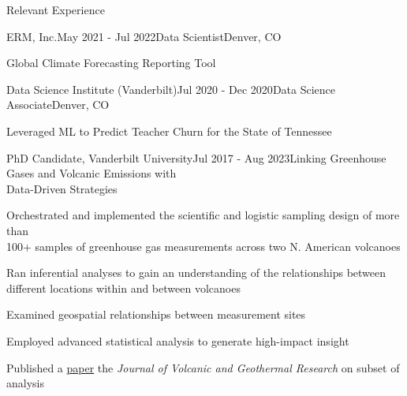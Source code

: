 \documentclass{resume} %
\begin{document}
\begin{rSection}{Relevant Experience}
\begin{rSubsection}{ERM, Inc.}{May 2021 - Jul 2022}{Data Scientist}{Denver, CO}
    \item {Global Climate Forecasting Reporting Tool}
        \vspace{-0.5em}
        \vspace{-0.5em}
        \vspace{0.25em}
    \end{rSubsection} 

    \begin{rSubsection}{Data Science Institute (Vanderbilt)}{Jul 2020 - Dec 2020}{Data Science Associate}{Denver, CO} 
        \item {Leveraged ML to Predict Teacher Churn for the State of Tennessee}
        \vspace{-0.5em}
    \end{rSubsection} 

    
    \begin{rSubsection}{PhD Candidate, Vanderbilt University}{Jul 2017 - Aug 2023}{Linking Greenhouse Gases and Volcanic Emissions with \\ Data-Driven Strategies}{}
        \item {Orchestrated and implemented the scientific and logistic sampling design of more than \\ 100+ samples of greenhouse gas measurements across two N. American volcanoes}
        \item {Ran inferential analyses to gain an understanding of the relationships between \\ different locations within and between volcanoes}
        \item {Examined geospatial relationships between measurement sites}
        \item {Employed advanced statistical analysis to generate high-impact insight}
        \item {Published a \href{https://www.sciencedirect.com/science/article/abs/pii/S0377027321000627#preview-section-abstract}{paper} the \emph{Journal of Volcanic and Geothermal Research} on subset of analysis}
        

\end{rSubsection}
\end{rSection}
\end{document}
